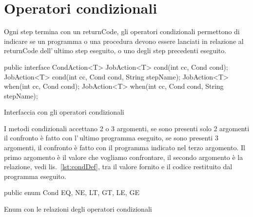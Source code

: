 \section{Operatori condizionali} \label{sec:opCond}
Ogni step termina con un returnCode, gli operatori condizionali permettono
di indicare se un programma o una procedura devono essere lanciati in relazione
al returnCode dell'\,ultimo step eseguito, o uno degli step precedenti eseguito.

\begin{elisting}[!htb]
    \begin{javacode}
        public interface CondAction<T> {
    JobAction<T> cond(int cc, Cond cond);
    JobAction<T> cond(int cc, Cond cond, String stepName);
    JobAction<T> when(int cc, Cond cond);
    JobAction<T> when(int cc, Cond cond, String stepName);
}
    \end{javacode}
    \caption{Interfaccia con gli operatori condizionali}
    \label{lst:condActionDef}
\end{elisting}

I metodi condizionali accettano 2 o 3 argomenti, se sono presenti solo 2
argomenti il confronto è fatto con l'\,ultimo programma eseguito, se sono
presenti 3 argomenti, il confronto è fatto con il programma indicato nel terzo
argomento.
Il primo argomento è il valore che vogliamo confrontare,
il secondo argomento è la relazione, vedi lis.~\ref{lst:condDef}, tra il valore
fornito e il codice restituito dal programma eseguito.

\begin{elisting}[!htb]
    \begin{javacode}
        public enum Cond {
    EQ, NE, LT, GT, LE, GE
}
    \end{javacode}
    \caption{Enum con le relazioni degli operatori condizionali}
    \label{lst:condDef}
\end{elisting}

